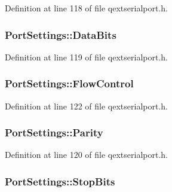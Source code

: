 Definition at line 118 of file qextserialport.\-h.

\hypertarget{struct_port_settings_a9ec9d5a304b2ac8d3a100d07bce7c0b6}{
\subsubsection[{Data\-Bits}]{ Port\-Settings\-::\-Data\-Bits}}\label{struct_port_settings_a9ec9d5a304b2ac8d3a100d07bce7c0b6}


Definition at line 119 of file qextserialport.\-h.

\hypertarget{struct_port_settings_a10720f6217b8d8b90c326ea030c43e30}{
\subsubsection[{Flow\-Control}]{ Port\-Settings\-::\-Flow\-Control}}\label{struct_port_settings_a10720f6217b8d8b90c326ea030c43e30}


Definition at line 122 of file qextserialport.\-h.

\hypertarget{struct_port_settings_a8d0bfbdcb40e9e3919e3f9829ae72582}{
\subsubsection[{Parity}]{ Port\-Settings\-::\-Parity}}\label{struct_port_settings_a8d0bfbdcb40e9e3919e3f9829ae72582}


Definition at line 120 of file qextserialport.\-h.

\hypertarget{struct_port_settings_a0752c70eb7e12f02ddf59739a056b04c}{
\subsubsection[{Stop\-Bits}]{ Port\-Settings\-::\-Stop\-Bits}}\label{struct_port_settings_a0752c70eb7e12f02ddf59739a056b04c}


